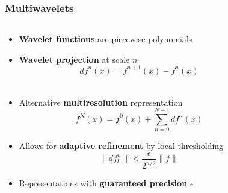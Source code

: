 \documentclass[mathserif, 8pt]{beamer}
\begin{document}
\begin{frame}
    \frametitle{Multiwavelets}
    \begin{columns}
    \begin{column}[b]{0.55\linewidth}
	\begin{itemize}
	    \item   \textbf{Wavelet functions} are piecewise polynomials
	    \item   \textbf{Wavelet projection} at scale $n$
		    \begin{equation}
			\nonumber
			df^n(x) = f^{n+1}(x) - f^{n}(x)
		    \end{equation}
		    \ \\
	    \item   Alternative \textbf{multiresolution} representation
		    \begin{equation}
			\nonumber
			f^N(x) = f^{0}(x) + \sum_{n=0}^{N-1} df^{n}(x)
		    \end{equation}
	    \item   Allows for \textbf{adaptive refinement} by local thresholding
		    \begin{equation}
			\nonumber
			\|df_l^n\| < \frac{\epsilon}{2^{n/2}}\|f\|
		    \end{equation}
	    \item   Representations with \textbf{guaranteed precision} $\epsilon$
	\end{itemize}
	\ \\
	\ \\
    \end{column}
    \begin{column}[b]{0.45\linewidth}
	\centering

\end{column}
\end{columns}
\end{frame}
\end{document}
